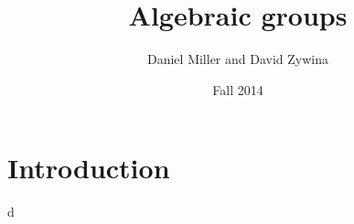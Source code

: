 \documentclass[oneside]{article}
\title{Algebraic groups}
\author{Daniel Miller and David Zywina}
\date{Fall 2014}
\begin{document}
\fontsize{10.5}{12.6} %
\selectfont

\maketitle
\tableofcontents


\section{Introduction}

d
\end{document}
